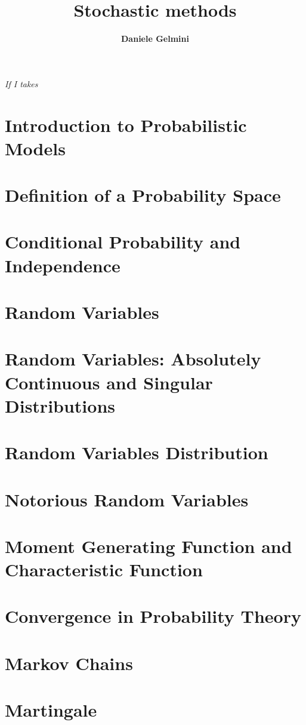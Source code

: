 \documentclass[a4paper,aps,secnumarabic,balancelastpage,amsmath,amssymb,nofootinbib,floatfix]{report}
\begin{document}
\title{\Huge\textbf{Stochastic methods}}
\author{\textbf{Daniele Gelmini}}
\date{}
\maketitle
\newpage

\cleardoublepage
\thispagestyle{empty}
\begin{flushright}
\itshape If I takes\\

\end{flushright}
\cleardoublepage

\tableofcontents

\chapter{Introduction to Probabilistic Models}
    
\chapter{Definition of a Probability Space}
        
\chapter{Conditional Probability and Independence}
    
\chapter{Random Variables}
        
\chapter{Random Variables: Absolutely Continuous and Singular Distributions}
    
\chapter{Random Variables Distribution}
       
\chapter{Notorious Random Variables}
    
\chapter{Moment Generating Function and Characteristic Function}
    
\chapter{Convergence in Probability Theory}
    
\chapter{Markov Chains}
    
\chapter{Martingale}
    

%    
\end{document}
